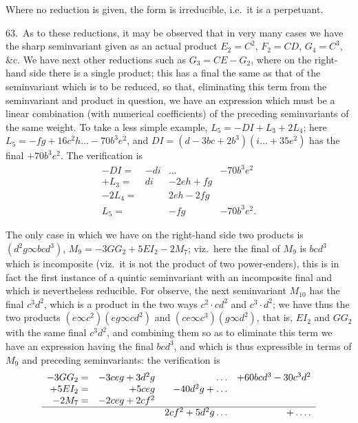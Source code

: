 \documentclass[11pt]{article}
\begin{document}
\medskip
Where no reduction is given, the form is irreducible, i.e.\ it is a perpetuant.

\clearpage
63.\ As to these reductions, it may be observed that in very many cases we have the sharp seminvariant given as an actual product $E_2 = C^2$, $F_2 = CD$, $G_4 = C^3$, \&c. We have next other reductions such as $G_3 = CE - G_2$, where on the right-hand side there is a single product; this has a final the same as that of the seminvariant which is to be reduced, so that, eliminating this term from the seminvariant and product in question, we have an expression which must be a linear combination (with numerical coefficients) of the preceding seminvariants of the same weight. To take a less simple example, $L_5 = - DI + L_3 + 2L_4$; here $L_5 = -fg + 16c^2h \ldots - 70b^3e^2$, and $DI = (d - 3bc + 2b^3)(i \ldots + 35e^2)$ has the final $+ 70b^3e^2$. The verification is
\[
\begin{array}{rrrr}
- DI = & -di & \ldots & -70b^3e^2 \\
+ L_3 = & di & -2eh + fg & \\
- 2L_4 = & & 2eh - 2fg & \\
\hline
L_5 = & & -fg & -70b^3e^2.
\end{array}
\]

The only case in which we have on the right-hand side two products is $(d^2g \infty bcd^3)$, $M_9 = -3GG_2 + 5EI_2 - 2M_7$; viz.\ here the final of $M_9$ is $bcd^3$ which is incomposite (viz.\ it is not the product of two power-enders), this is in fact the first instance of a quintic seminvariant with an incomposite final and which is nevertheless reducible. For observe, the next seminvariant $M_{10}$ has the final $c^3d^2$, which is a product in the two ways $c^2 \cdot cd^2$ and $c^3 \cdot d^2$; we have thus the two products $(e \infty c^2)(eg \infty cd^2)$ and $(ce \infty c^3)(g \infty d^2)$, that is, $EI_2$ and $GG_2$ with the same final $c^3d^2$, and combining them so as to eliminate this term we have an expression having the final $bcd^3$, and which is thus expressible in terms of $M_9$ and preceding seminvariants: the verification is
\[
\begin{array}{rrrr}
- 3GG_2 = & -3ceg + 3d^2g & \ldots & + 60bcd^3 - 30c^3d^2 \\
+ 5EI_2 = & +5ceg & -40d^2g + \ldots & \\
- 2M_7 = & -2ceg + 2cf^2 & & \\
\hline
& & 2cf^2 + 5d^2g \ldots & + \ldots.
\end{array}
\]
\end{document}
